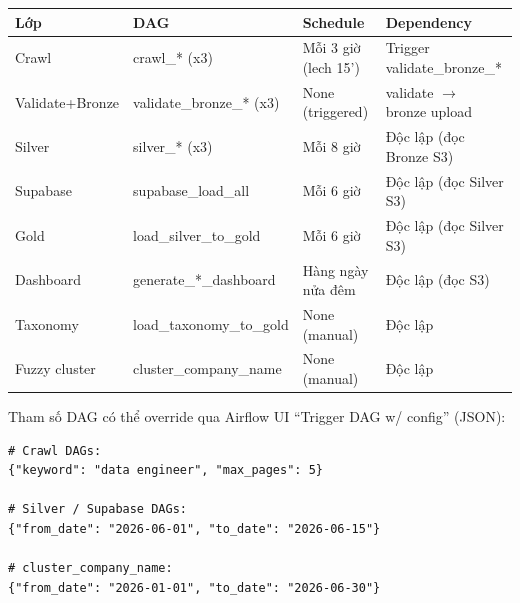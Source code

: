\begin{longtable}{p{3.5cm} p{3.5cm} p{3cm} p{4cm}}
\toprule
\textbf{Lớp} & \textbf{DAG} & \textbf{Schedule} & \textbf{Dependency} \\
\midrule
\endhead
Crawl & crawl\_* (x3) & Mỗi 3 giờ (lech 15') & Trigger validate\_bronze\_* \\
Validate+Bronze & validate\_bronze\_* (x3) & None (triggered) & validate $\to$ bronze upload \\
Silver & silver\_* (x3) & Mỗi 8 giờ & Độc lập (đọc Bronze S3) \\
Supabase & supabase\_load\_all & Mỗi 6 giờ & Độc lập (đọc Silver S3) \\
Gold & load\_silver\_to\_gold & Mỗi 6 giờ & Độc lập (đọc Silver S3) \\
Dashboard & generate\_*\_dashboard & Hàng ngày nửa đêm & Độc lập (đọc S3) \\
Taxonomy & load\_taxonomy\_to\_gold & None (manual) & Độc lập \\
Fuzzy cluster & cluster\_company\_name & None (manual) & Độc lập \\
\bottomrule
\end{longtable}

Tham số DAG có thể override qua Airflow UI ``Trigger DAG w/ config'' (JSON):

\begin{lstlisting}[style=pystyle, caption={Tham số override qua Airflow UI}]
# Crawl DAGs:
{"keyword": "data engineer", "max_pages": 5}

# Silver / Supabase DAGs:
{"from_date": "2026-06-01", "to_date": "2026-06-15"}

# cluster_company_name:
{"from_date": "2026-01-01", "to_date": "2026-06-30"}
\end{lstlisting}
